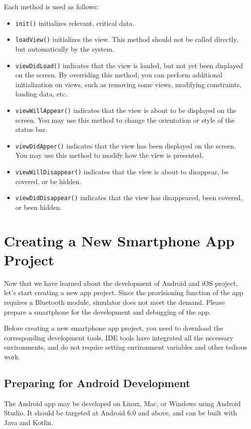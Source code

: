 \documentclass[a4paper,12pt]{book}
\begin{document}
Each method is used as follows:

\begin{itemize}
    \item \verb|init()| initializes relevant, critical data.
    \item \verb|loadView()| initializes the view. This method should not be called directly, but automatically by the system.
    \item \verb|viewDidLoad()| indicates that the view is loaded, but not yet been displayed on the screen. By overriding this method, you can perform additional initialization on views, such as removing some views, modifying constraints, loading data, etc.
    \item \verb|viewWillAppear()| indicates that the view is about to be displayed on the screen. You may use this method to change the orientation or style of the status bar.
    \item \verb|viewDidApper()| indicates that the view has been displayed on the screen. You may use this method to modify how the view is presented.
    \item \verb|viewWillDisappear()| indicates that the view is about to disappear, be covered, or be hidden.
    \item \verb|viewDidDisappear()| indicates that the view has disappeared, been covered, or been hidden.
\end{itemize}

\section{Creating a New Smartphone App Project}
Now that we have learned about the development of Android and iOS project, let’s start creating a new app project. Since the provisioning function of the app requires a Bluetooth module, simulator does not meet the demand. Please prepare a smartphone for the development and debugging of the app.

Before creating a new smartphone app project, you need to download the corresponding development tools. IDE tools have integrated all the necessary environments, and do not require setting environment variables and other tedious work.

\subsection{Preparing for Android Development}
The Android app may be developed on Linux, Mac, or Windows using Android Studio. It should be targeted at Android 6.0 and above, and can be built with Java and Kotlin.
\end{document}
